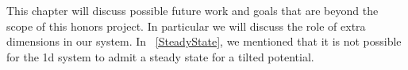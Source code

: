 This chapter will discuss possible future work and goals that are beyond the scope of this honors project. In particular we will discuss the role of extra dimensions in our system. In ~\autoref{SteadyState}, we mentioned that it is not possible for the 1d system to admit a steady state for a tilted potential.
